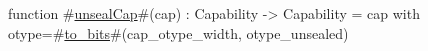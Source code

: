 function #\hyperref[sailRISCVzunsealCap]{unsealCap}#(cap) : Capability -> Capability =
    {cap with otype=#\hyperref[sailRISCVztozybits]{to\_bits}#(cap_otype_width, otype_unsealed)}
